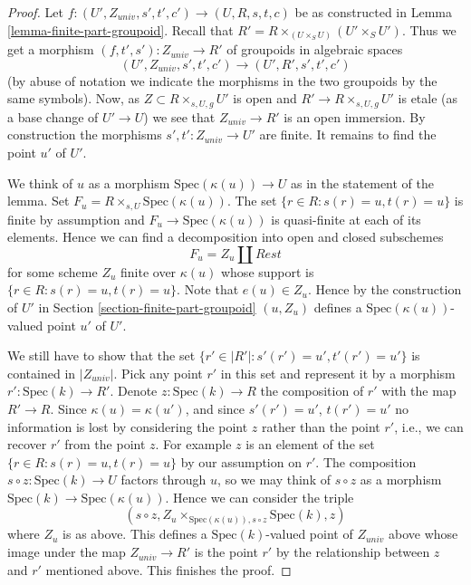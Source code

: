 \begin{proof}
Let $f : (U', Z_{univ}, s', t', c') \to (U, R, s, t, c)$ be as constructed in
Lemma \ref{lemma-finite-part-groupoid}.
Recall that $R' = R \times_{(U \times_S U)} (U' \times_S U')$.
Thus we get a morphism $(f, t', s') : Z_{univ} \to R'$ of groupoids
in algebraic spaces
$$
(U', Z_{univ}, s', t', c') \to (U', R', s', t', c')
$$
(by abuse of notation we indicate the morphisms in the two groupoids
by the same symbols). Now, as $Z \subset R \times_{s, U, g} U'$ is open
and $R' \to R \times_{s, U, g} U'$ is etale (as a base change
of $U' \to U$) we see that $Z_{univ} \to R'$ is an open immersion.
By construction the morphisms $s', t' : Z_{univ} \to U'$ are finite.
It remains to find the point $u'$ of $U'$.

\medskip\noindent
We think of $u$ as a morphism $\text{Spec}(\kappa(u)) \to U$ as in
the statement of the lemma. Set $F_u = R \times_{s, U} \text{Spec}(\kappa(u))$.
The set $\{r \in R : s(r) = u, t(r) = u\}$ is finite by assumption
and $F_u \to \text{Spec}(\kappa(u))$ is quasi-finite at each
of its elements. Hence we can find a decomposition into open and closed
subschemes
$$
F_u = Z_u \coprod Rest
$$
for some scheme $Z_u$ finite over $\kappa(u)$ whose support is
$\{r \in R : s(r) = u, t(r) = u\}$. Note that $e(u) \in Z_u$.
Hence by the construction of $U'$ in
Section \ref{section-finite-part-groupoid}
$(u, Z_u)$ defines a $\text{Spec}(\kappa(u))$-valued
point $u'$ of $U'$.

\medskip\noindent
We still have to show that the set
$\{r' \in |R'| : s'(r') = u', t'(r') = u'\}$
is contained in $|Z_{univ}|$.
Pick any point $r'$ in this set and represent it by a morphism
$r' : \text{Spec}(k) \to R'$. Denote $z : \text{Spec}(k) \to R$
the composition of $r'$ with the map $R' \to R$.
Since $\kappa(u) = \kappa(u')$, and since $s'(r') = u'$, $t(r') = u'$
no information is lost by considering the point $z$ rather than the
point $r'$, i.e., we can recover $r'$ from the point $z$.
For example $z$ is an element of the set $\{r \in R : s(r) = u, t(r) = u\}$
by our assumption on $r'$. The composition
$s \circ z : \text{Spec}(k) \to U$ factors through $u$, so we may
think of $s \circ z$ as a morphism $\text{Spec}(k) \to \text{Spec}(\kappa(u))$.
Hence we can consider the triple
$$
(s \circ z, Z_u \times_{\text{Spec}(\kappa(u)), s \circ z} \text{Spec}(k), z)
$$
where $Z_u$ is as above. This defines a $\text{Spec}(k)$-valued point
of $Z_{univ}$ above whose image under the map $Z_{univ} \to R'$
is the point $r'$ by the relationship between $z$ and $r'$ mentioned
above. This finishes the proof.
\end{proof}

